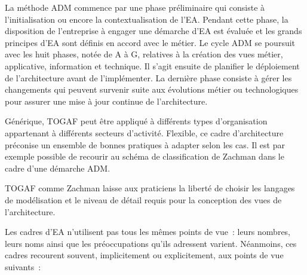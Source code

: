 La méthode ADM commence par une phase préliminaire qui consiste à l'initialisation ou encore la contextualisation de l'EA. Pendant cette phase, la disposition de l'entreprise à engager une démarche d'EA est évaluée et les grands principes d'EA sont définis en accord avec le métier. Le cycle ADM se poursuit avec les huit phases, notée de A à G, relatives à la création des vues métier, applicative, information et technique. Il s'agit ensuite de planifier le déploiement de l'architecture avant de l'implémenter. La dernière phase consiste à gérer les changements qui peuvent survenir suite aux évolutions métier ou technologiques pour assurer une mise à jour continue de l'architecture. 

Générique, TOGAF peut être appliqué à différents types d'organisation appartenant à différents secteurs d'activité. Flexible, ce cadre d'architecture préconise  un ensemble de bonnes pratiques à adapter selon les cas. Il est par exemple possible de recourir au schéma de classification de Zachman dans le cadre d'une démarche ADM.

TOGAF comme Zachman laisse aux praticiens la liberté de choisir les langages de modélisation et le niveau de détail requis pour la conception des vues de l'architecture. 

%
%
%
%
%
%
%


Les cadres d'EA n'utilisent pas tous les mêmes points de vue~: leurs nombres, leurs noms ainsi que les préoccupations qu'ils adressent varient. Néanmoins, ces 
cadres recourent souvent, implicitement ou explicitement, aux points de vue suivants~:

